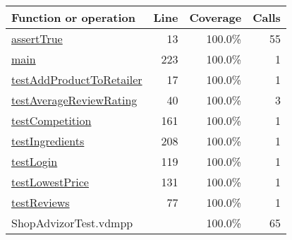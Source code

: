 \bigskip
\begin{longtable}{|l|r|r|r|}
\hline
Function or operation & Line & Coverage & Calls \\
\hline
\hline
\hyperref[assertTrue:13]{assertTrue} & 13&100.0\% & 55 \\
\hline
\hyperref[main:223]{main} & 223&100.0\% & 1 \\
\hline
\hyperref[testAddProductToRetailer:17]{testAddProductToRetailer} & 17&100.0\% & 1 \\
\hline
\hyperref[testAverageReviewRating:40]{testAverageReviewRating} & 40&100.0\% & 3 \\
\hline
\hyperref[testCompetition:161]{testCompetition} & 161&100.0\% & 1 \\
\hline
\hyperref[testIngredients:208]{testIngredients} & 208&100.0\% & 1 \\
\hline
\hyperref[testLogin:119]{testLogin} & 119&100.0\% & 1 \\
\hline
\hyperref[testLowestPrice:131]{testLowestPrice} & 131&100.0\% & 1 \\
\hline
\hyperref[testReviews:77]{testReviews} & 77&100.0\% & 1 \\
\hline
\hline
ShopAdvizorTest.vdmpp & & 100.0\% & 65 \\
\hline
\end{longtable}

